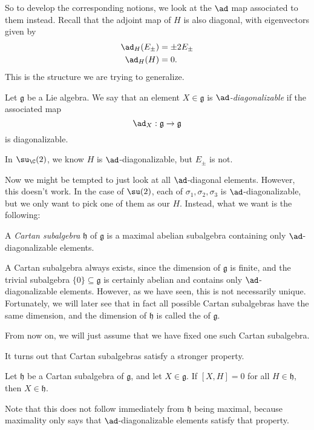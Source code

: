 \documentclass[a4paper]{article}
\begin{document}
So to develop the corresponding notions, we look at the $\ad$ map associated to them instead. Recall that the adjoint map of $H$ is also diagonal, with eigenvectors given by
\begin{align*}
  \ad_H(E_{\pm}) &= \pm 2 E_{\pm}\\
  \ad_H(H) &= 0.
\end{align*}
This is the structure we are trying to generalize.

\begin{defi}[$\ad$-diagonalizable]
  Let $\mathfrak{g}$ be a Lie algebra. We say that an element $X \in \mathfrak{g}$ is \emph{$\ad$-diagonalizable} if the associated map
  \[
    \ad_X: \mathfrak{g} \to \mathfrak{g}
  \]
  is diagonalizable.
\end{defi}

\begin{eg}
  In $\su_\C(2)$, we know $H$ is $\ad$-diagonalizable, but $E_{\pm}$ is not.
\end{eg}

Now we might be tempted to just look at all $\ad$-diagonal elements. However, this doesn't work. In the case of $\su(2)$, each of $\sigma_1, \sigma_2, \sigma_3$ is $\ad$-diagonalizable, but we only want to pick one of them as our $H$. Instead, what we want is the following:

\begin{defi}
  A \emph{Cartan subalgebra} $\mathfrak{h}$ of $\mathfrak{g}$ is a maximal abelian subalgebra containing only $\ad$-diagonalizable elements.
\end{defi}
A Cartan subalgebra always exists, since the dimension of $\mathfrak{g}$ is finite, and the trivial subalgebra $\{0\} \subseteq \mathfrak{g}$ is certainly abelian and contains only $\ad$-diagonalizable elements. However, as we have seen, this is not necessarily unique. Fortunately, we will later see that in fact all possible Cartan subalgebras have the same dimension, and the dimension of $\mathfrak{h}$ is called the  of $\mathfrak{g}$. %

From now on, we will just assume that we have fixed one such Cartan subalgebra.

It turns out that Cartan subalgebras satisfy a stronger property.
\begin{prop}
  Let $\mathfrak{h}$ be a Cartan subalgebra of $\mathfrak{g}$, and let $X \in \mathfrak{g}$. If $[X, H] = 0$ for all $H \in \mathfrak{h}$, then $X \in \mathfrak{h}$.
\end{prop}
Note that this does not follow immediately from $\mathfrak{h}$ being maximal, because maximality only says that $\ad$-diagonalizable elements satisfy that property.
\end{document}
